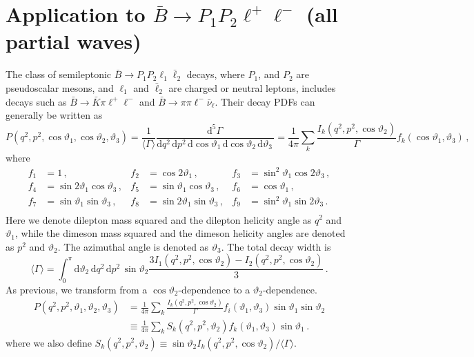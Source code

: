\documentclass[aps,prd,reprint,nofootinbib,preprintnumbers]{revtex4}
\newcommand{\rmdx}[1]{\mbox{d} #1 \,} %
\renewcommand{\theta}{\vartheta}
\begin{document}
\section{Application to $\bar{B}\to P_1 P_2\ell^+\ell^-$ (all partial waves)}
\label{app:btokpill}

The class of semileptonic $\bar{B}\to P_1 P_2 \ell_1\bar\ell_2$ decays, where $P_1$, and $P_2$ are pseudoscalar mesons,
and $\ell_1$ and $\bar\ell_2$ are charged or neutral leptons, includes decays
such as $\bar{B}\to\bar{K}\pi\ell^+\ell^-$ and $\bar{B}\to \pi\pi\ell^-\bar\nu_\ell$.
Their decay PDFs can generally be written as \cite{Lee:1992ih}
\begin{equation}
    P(q^2, p^2, \cos\theta_1, \cos \theta_2, \theta_3) = \frac{1}{\langle \Gamma\rangle}\frac{\rmdx{^5 \Gamma}}{\rmdx{q^2} \rmdx{p^2} \rmdx{\cos\theta_1} \rmdx{\cos\theta_2} \rmdx{\theta_3}} = \frac{1}{4\pi} \sum_k \frac{I_k(q^2, p^2, \cos\theta_2)}{\Gamma} f_k(\cos\theta_1,\theta_3)\,,
\end{equation}
where
\begin{equation}
\begin{aligned}
    f_1 & = 1\,,              &
    f_2 & = \cos 2\theta_1\,, &
    f_3 & = \sin^2\theta_1 \cos 2\theta_3\,,\\
    f_4 & = \sin 2\theta_1 \cos  \theta_3\,,&
    f_5 & = \sin  \theta_1 \cos  \theta_3\,,&
    f_6 & = \cos  \theta_1\,, \\
    f_7 & = \sin  \theta_1 \sin  \theta_3\,,&
    f_8 & = \sin 2\theta_1 \sin  \theta_3\,,&
    f_9 & = \sin^2\theta_1 \sin 2\theta_3\,.\\
\end{aligned}
\end{equation}
Here we denote dilepton mass squared and the dilepton helicity angle as $q^2$ and $\theta_1$, while
the dimeson mass squared and the dimeson helicity angles are denoted as $p^2$ and $\theta_2$. The
azimuthal angle is denoted as $\theta_3$.
The total decay width is
\begin{equation}
    \langle \Gamma\rangle = \int_0^\pi \rmdx{\theta_2} \rmdx{q^2} \rmdx{p^2} \sin\theta_2 \frac{3I_1(q^2, p^2, \cos\theta_2) - I_2(q^2, p^2, \cos\theta_2)}{3}\,.
\end{equation}
As previous, we transform from a $\cos\theta_2$-dependence to a $\theta_2$-dependence.
\begin{equation}
\begin{aligned}
    P(q^2, p^2, \theta_1, \theta_2, \theta_3)
    & = \frac{1}{4\pi} \sum_k \frac{I_k(q^2, p^2, \cos\theta_2)}{\Gamma} f_i(\theta_1, \theta_3) \sin\theta_1 \sin\theta_2\\
    & \equiv \frac{1}{4\pi} \sum_k S_k(q^2, p^2, \theta_2) f_k(\theta_1, \theta_3) \sin\theta_1\,.
\end{aligned}
\end{equation}
where we also define $S_k(q^2, p^2, \theta_2) \equiv \sin\theta_2 I_k(q^2, p^2, \cos\theta_2) / \langle \Gamma\rangle$.\\
\end{document}
